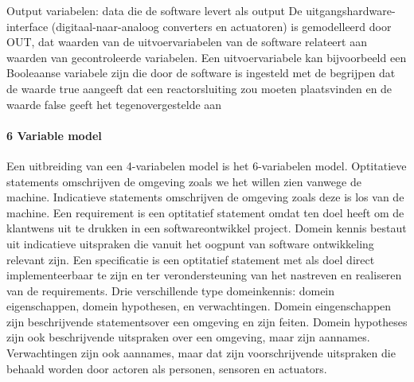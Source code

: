 \documentclass{article}
\begin{document}
	Output variabelen: data die de software levert als output
	De uitgangshardware-interface (digitaal-naar-analoog converters en actuatoren) is gemodelleerd
	door OUT, dat waarden van de uitvoervariabelen van de software relateert aan waarden van gecontroleerde variabelen. Een uitvoervariabele kan bijvoorbeeld een Booleaanse variabele zijn die door de software is ingesteld met de
	begrijpen dat de waarde true aangeeft dat een reactorsluiting zou moeten plaatsvinden en de waarde
	false geeft het tegenovergestelde aan
	
	
	\paragraph{6 Variable model}
	Een uitbreiding van een 4-variabelen model is het 6-variabelen model.
	Optitatieve statements omschrijven de omgeving zoals we het willen zien vanwege de machine. 
	Indicatieve statements omschrijven de omgeving zoals deze is los van de machine. 
	Een requirement is een optitatief statement omdat ten doel heeft om de klantwens uit te drukken in een softwareontwikkel project. 
	Domein kennis bestaut uit indicatieve uitspraken die vanuit het oogpunt van software ontwikkeling relevant zijn. 
	Een specificatie is een optitatief statement met als doel direct implementeerbaar te zijn en ter verondersteuning van het nastreven en realiseren van de requirements. 
	Drie verschillende type domeinkennis: domein eigenschappen, domein hypothesen, en verwachtingen. 
	Domein eingenschappen  zijn beschrijvende statementsover een omgeving en zijn feiten. Domein hypotheses  zijn ook beschrijvende uitspraken over een omgeving, maar zijn aannames. 
	Verwachtingen zijn ook aannames, maar dat zijn voorschrijvende uitspraken die behaald worden door actoren als personen, sensoren en actuators. 
	
\end{document}
